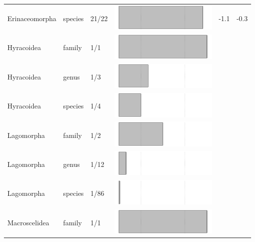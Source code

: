 \begin{longtable}{lL{1.8cm}C{2cm}lcc}
  Erinaceomorpha & species & 21/22 & \includegraphics[width=0.20\linewidth, height=0.05\linewidth]{Missing_mammals/Table_figures/bar30.pdf} & -1.1 & -0.3 \\ 
  Hyracoidea & family & 1/1 & \includegraphics[width=0.20\linewidth, height=0.05\linewidth]{Missing_mammals/Table_figures/bar31.pdf} &   &   \\ 
  Hyracoidea & genus & 1/3 & \includegraphics[width=0.20\linewidth, height=0.05\linewidth]{Missing_mammals/Table_figures/bar32.pdf} &   &   \\ 
  Hyracoidea & species & 1/4 & \includegraphics[width=0.20\linewidth, height=0.05\linewidth]{Missing_mammals/Table_figures/bar33.pdf} &   &   \\ 
  Lagomorpha & family & 1/2 & \includegraphics[width=0.20\linewidth, height=0.05\linewidth]{Missing_mammals/Table_figures/bar34.pdf} &   &   \\ 
  Lagomorpha & genus & 1/12 & \includegraphics[width=0.20\linewidth, height=0.05\linewidth]{Missing_mammals/Table_figures/bar35.pdf} &   &   \\ 
  Lagomorpha & species & 1/86 & \includegraphics[width=0.20\linewidth, height=0.05\linewidth]{Missing_mammals/Table_figures/bar36.pdf} &   &   \\ 
  Macroscelidea & family & 1/1 & \includegraphics[width=0.20\linewidth, height=0.05\linewidth]{Missing_mammals/Table_figures/bar37.pdf} &   &   \\ 

\end{longtable}
